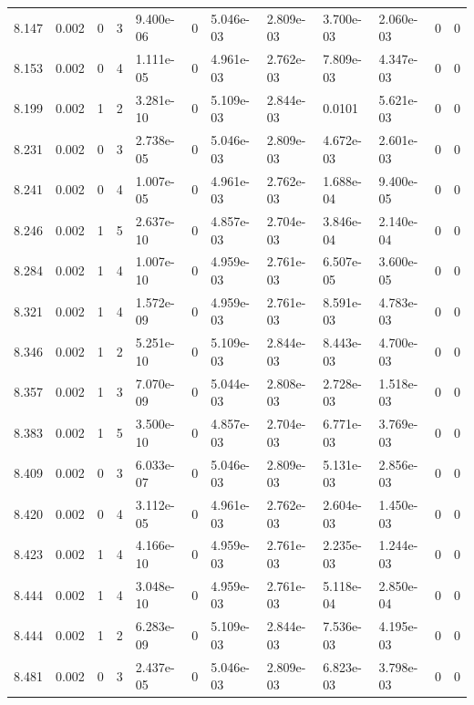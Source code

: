 \documentclass[preview]{standalone}
\begin{document}
{{{{{{{{{{{\begin{tabular}{L{1.2cm}C{1.2cm} C{0.3cm}C{0.5cm} C{1.4cm}C{1.4cm} C{1.4cm}C{1.4cm} C{1.6cm}C{1.6cm} C{1.6cm}C{1.6cm}}
  8.147  &  0.002  & 0     &  3 &  9.400e-06  & 0  &  5.046e-03&   2.809e-03& 3.700e-03 & 2.060e-03   &  0 & 0  \\ 
  8.153  &  0.002  & 0     &  4 &  1.111e-05  & 0  &  4.961e-03&   2.762e-03& 7.809e-03 & 4.347e-03   &  0 & 0  \\ 
  8.199  &  0.002  & 1     &  2 &  3.281e-10  & 0  &  5.109e-03&   2.844e-03& 0.0101 & 5.621e-03   &  0 & 0  \\ 
  8.231  &  0.002  & 0     &  3 &  2.738e-05  & 0  &  5.046e-03&   2.809e-03& 4.672e-03 & 2.601e-03   &  0 & 0  \\ 
  8.241  &  0.002  & 0     &  4 &  1.007e-05  & 0  &  4.961e-03&   2.762e-03& 1.688e-04 & 9.400e-05   &  0 & 0  \\ 
  8.246  &  0.002  & 1     &  5 &  2.637e-10  & 0  &  4.857e-03&   2.704e-03& 3.846e-04 & 2.140e-04   &  0 & 0  \\ 
  8.284  &  0.002  & 1     &  4 &  1.007e-10  & 0  &  4.959e-03&   2.761e-03& 6.507e-05 & 3.600e-05   &  0 & 0  \\ 
  8.321  &  0.002  & 1     &  4 &  1.572e-09  & 0  &  4.959e-03&   2.761e-03& 8.591e-03 & 4.783e-03   &  0 & 0  \\ 
  8.346  &  0.002  & 1     &  2 &  5.251e-10  & 0  &  5.109e-03&   2.844e-03& 8.443e-03 & 4.700e-03   &  0 & 0  \\ 
  8.357  &  0.002  & 1     &  3 &  7.070e-09  & 0  &  5.044e-03&   2.808e-03& 2.728e-03 & 1.518e-03   &  0 & 0  \\ 
  8.383  &  0.002  & 1     &  5 &  3.500e-10  & 0  &  4.857e-03&   2.704e-03& 6.771e-03 & 3.769e-03   &  0 & 0  \\ 
  8.409  &  0.002  & 0     &  3 &  6.033e-07  & 0  &  5.046e-03&   2.809e-03& 5.131e-03 & 2.856e-03   &  0 & 0  \\ 
  8.420  &  0.002  & 0     &  4 &  3.112e-05  & 0  &  4.961e-03&   2.762e-03& 2.604e-03 & 1.450e-03   &  0 & 0  \\ 
  8.423  &  0.002  & 1     &  4 &  4.166e-10  & 0  &  4.959e-03&   2.761e-03& 2.235e-03 & 1.244e-03   &  0 & 0  \\ 
  8.444  &  0.002  & 1     &  4 &  3.048e-10  & 0  &  4.959e-03&   2.761e-03& 5.118e-04 & 2.850e-04   &  0 & 0  \\ 
  8.444  &  0.002  & 1     &  2 &  6.283e-09  & 0  &  5.109e-03&   2.844e-03& 7.536e-03 & 4.195e-03   &  0 & 0  \\ 
  8.481  &  0.002  & 0     &  3 &  2.437e-05  & 0  &  5.046e-03&   2.809e-03& 6.823e-03 & 3.798e-03   &  0 & 0  \\ 

\end{tabular}}}}}}}}}}}}
\end{document}
